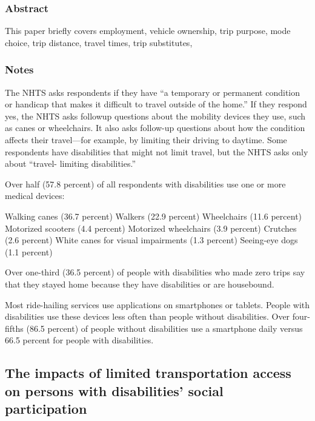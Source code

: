 \documentclass[
]{article}
\begin{document}
\hypertarget{abstract-27}{%
\subsubsection{Abstract}\label{abstract-27}}

This paper briefly covers employment, vehicle ownership, trip purpose,
mode choice, trip distance, travel times, trip substitutes,

\hypertarget{notes-27}{%
\subsubsection{Notes}\label{notes-27}}

The NHTS asks respondents if they have ``a temporary or permanent
condition or handicap that makes it difficult to travel outside of the
home.'' If they respond yes, the NHTS asks followup questions about the
mobility devices they use, such as canes or wheelchairs. It also asks
follow-up questions about how the condition affects their travel---for
example, by limiting their driving to daytime. Some respondents have
disabilities that might not limit travel, but the NHTS asks only about
``travel- limiting disabilities.''

Over half (57.8 percent) of all respondents with disabilities use one or
more medical devices:

Walking canes (36.7 percent) Walkers (22.9 percent) Wheelchairs (11.6
percent) Motorized scooters (4.4 percent) Motorized wheelchairs (3.9
percent) Crutches (2.6 percent) White canes for visual impairments (1.3
percent) Seeing-eye dogs (1.1 percent)

Over one-third (36.5 percent) of people with disabilities who made zero
trips say that they stayed home because they have disabilities or are
housebound.

Most ride-hailing services use applications on smartphones or tablets.
People with disabilities use these devices less often than people
without disabilities. Over four-fifths (86.5 percent) of people without
disabilities use a smartphone daily versus 66.5 percent for people with
disabilities.

\hypertarget{the-impacts-of-limited-transportation-access-on-persons-with-disabilities-social-participation}{%
\subsection{The impacts of limited transportation access on persons with
disabilities' social
participation}\label{the-impacts-of-limited-transportation-access-on-persons-with-disabilities-social-participation}}
\end{document}

